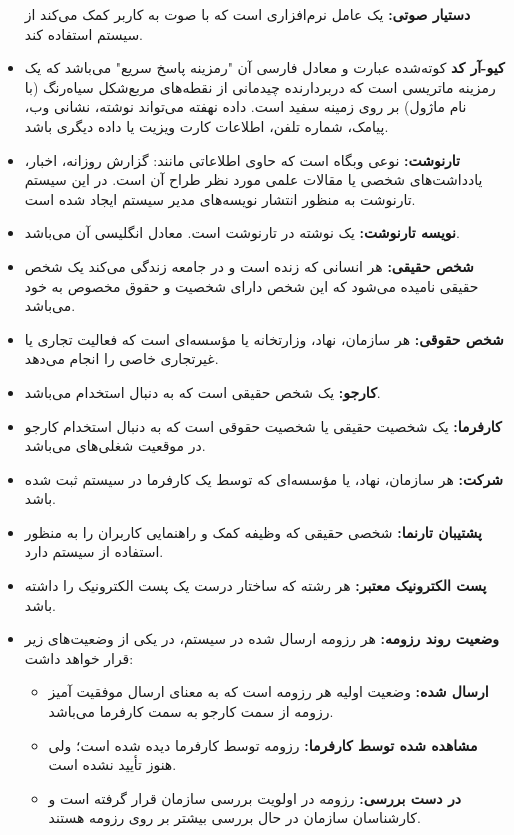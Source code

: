 \documentclass[12pt]{article}
\begin{document}
\begin{itemize}
		\textbf{دستیار صوتی:}
		یک عامل نرم‌افزاری است که با صوت به کاربر کمک می‌کند از سیستم استفاده کند.
		\item
		\textbf{کیو-آر کد}
		کوته‌شده عبارت
		و معادل فارسی آن "رمزینه پاسخ سریع" می‌باشد که یک رمزینه ماتریسی است که دربردارنده چیدمانی از نقطه‌های مربع‌شکل سیاه‌رنگ (با نام ماژول) بر روی زمینه سفید است. داده نهفته می‌تواند نوشته، نشانی وب، پیامک، شماره تلفن، اطلاعات کارت ویزیت یا داده دیگری باشد.
		\item
		\textbf{تارنوشت:}
		نوعی وبگاه است که حاوی اطلاعاتی مانند: گزارش روزانه، اخبار، یادداشت‌های شخصی یا مقالات علمی مورد نظر طراح آن است. در این سیستم تارنوشت به منظور انتشار نویسه‌های مدیر سیستم ایجاد شده است.
		\item
		\textbf{نویسه‌ تارنوشت:}
		یک نوشته در تارنوشت است. معادل انگلیسی آن
		می‌باشد.
		\item
		\textbf{شخص حقیقی:}
		هر انسانی که زنده است و در جامعه زندگی می‌کند یک شخص حقیقی نامیده می‌شود که این شخص دارای شخصیت و حقوق مخصوص به خود می‌باشد.
		\item
		\textbf{شخص حقوقی:}
		هر سازمان، نهاد، وزارتخانه یا مؤسسه‌ای است که فعالیت تجاری یا غیر‌تجاری خاصی را انجام می‌دهد.
		\item
		\textbf{کارجو:}
		یک شخص حقیقی است که به دنبال استخدام می‌باشد.
		\item
		\textbf{کارفرما:}
		یک شخصیت حقیقی یا شخصیت حقوقی است که به دنبال استخدام کارجو در موقعیت شغلی‌های  می‌باشد.
		\item
		\textbf{شرکت:}
		هر سازمان، نهاد، یا مو‌ٔسسه‌ای که توسط یک کارفرما در سیستم ثبت شده باشد.
		\item
		\textbf{پشتیبان تارنما:}
		شخصی حقیقی که وظیفه کمک و راهنمایی کاربران را به منظور استفاده از سیستم دارد.
		\item
		\textbf{پست الکترونیک معتبر:}
		هر رشته که ساختار درست یک پست الکترونیک را داشته باشد.
		\item
		\textbf{وضعیت روند رزومه:}
		هر رزومه ارسال شده در سیستم، در یکی از وضعیت‌های زیر قرار خواهد داشت:
		\begin{itemize}
			\item
			\textbf{ارسال شده:}
			وضعیت اولیه هر رزومه است که به معنای ارسال موفقیت آمیز رزومه از سمت کارجو به سمت کارفرما می‌باشد.
			\item
			\textbf{‌مشاهده شده توسط کارفرما:}
			رزومه توسط کارفرما دیده شده است؛ ولی هنوز تأیید نشده است.
			\item
			\textbf{در دست بررسی:}
			رزومه در اولویت بررسی سازمان قرار گرفته است و کارشناسان سازمان در حال بررسی بیشتر بر روی رزومه هستند.

\end{itemize}
\end{itemize}
\end{document}

